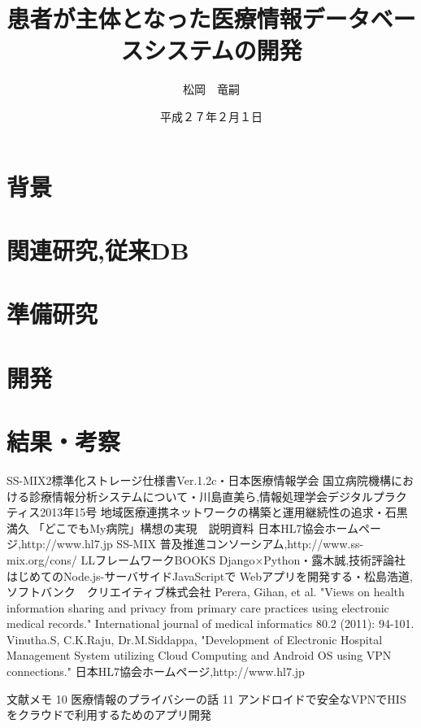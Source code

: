 \documentclass[12pt]{sotsuron}
\title{患者が主体となった医療情報データベースシステムの開発}
\author{松岡　竜嗣}
\date{平成２７年２月１日}
\affiliation{電子機械工学専攻}
\begin{document}
\maketitle

\begin{abstract}


\end{abstract}

\tableofcontents
\clearpage


\section{背景}


\section{関連研究,従来DB}


\section{準備研究}


\section{開発}


\section{結果・考察}






\appendix

%


\begin{thebibliography}{9}
  SS-MIX2標準化ストレージ仕様書Ver.1.2c・日本医療情報学会
   国立病院機構における診療情報分析システムについて・川島直美ら,情報処理学会デジタルプラクティス2013年15号
   地域医療連携ネットワークの構築と運用継続性の追求・石黒満久
   「どこでもMy病院」構想の実現　説明資料
   日本HL7協会ホームページ,http://www.hl7.jp
   SS-MIX 普及推進コンソーシアム,http://www.ss-mix.org/cons/
   LLフレームワークBOOKS Django×Python・露木誠,技術評論社
   はじめてのNode.js-サーバサイドJavaScriptで Webアプリを開発する・松島浩道,ソフトバンク　クリエイティブ株式会社
   Perera, Gihan, et al. "Views on health information sharing and privacy from primary care practices using electronic medical records." International journal of medical informatics 80.2 (2011): 94-101.
   Vinutha.S, C.K.Raju, Dr.M.Siddappa, "Development of Electronic Hospital Management System utilizing Cloud Computing and Android OS using VPN connections."
   日本HL7協会ホームページ,http://www.hl7.jp

\end{thebibliography}


  文献メモ
  10 医療情報のプライバシーの話
  11 アンドロイドで安全なVPNでHISをクラウドで利用するためのアプリ開発


\clearpage

\listoffigures
\clearpage

\listoftables
\clearpage
\end{document}
